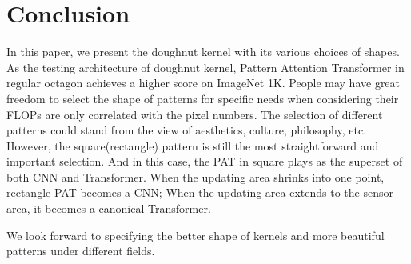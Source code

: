 \documentclass{article}
\theoremstyle{plain}
\theoremstyle{definition}
\theoremstyle{remark}
\begin{document}
\section{Conclusion}
In this paper, we present the doughnut kernel with its various choices of shapes. As the testing architecture of doughnut kernel, Pattern Attention Transformer in regular octagon achieves a higher score on ImageNet 1K. People may have great freedom to select the shape of patterns for specific needs when considering their FLOPs are only correlated with the pixel numbers. The selection of different patterns could stand from the view of aesthetics, culture, philosophy, etc. However, the square(rectangle) pattern is still the most straightforward and important selection. And in this case, the PAT in square plays as the superset of both CNN and Transformer. When the updating area shrinks into one point, rectangle PAT becomes a CNN; When the updating area extends to the sensor area, it becomes a canonical Transformer.

We look forward to specifying the better shape of kernels and more beautiful patterns under different fields.






\newpage
\appendix
\onecolumn
\end{document}
